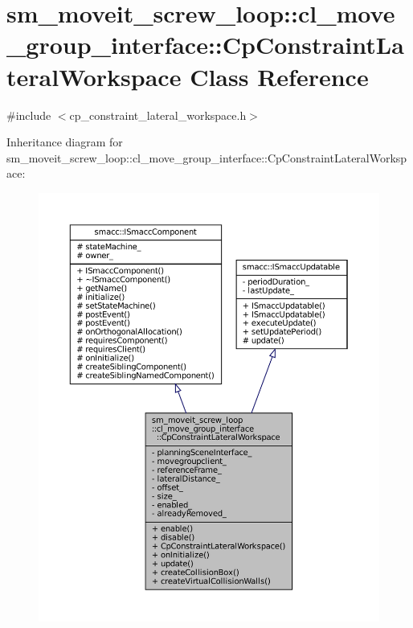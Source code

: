 \hypertarget{classsm__moveit__screw__loop_1_1cl__move__group__interface_1_1CpConstraintLateralWorkspace}{}\section{sm\+\_\+moveit\+\_\+screw\+\_\+loop\+:\+:cl\+\_\+move\+\_\+group\+\_\+interface\+:\+:Cp\+Constraint\+Lateral\+Workspace Class Reference}
\label{classsm__moveit__screw__loop_1_1cl__move__group__interface_1_1CpConstraintLateralWorkspace}


{\ttfamily \#include $<$cp\+\_\+constraint\+\_\+lateral\+\_\+workspace.\+h$>$}



Inheritance diagram for sm\+\_\+moveit\+\_\+screw\+\_\+loop\+:\+:cl\+\_\+move\+\_\+group\+\_\+interface\+:\+:Cp\+Constraint\+Lateral\+Workspace\+:
\nopagebreak
\begin{figure}[H]
\begin{center}
\leavevmode
\includegraphics[width=350pt]{classsm__moveit__screw__loop_1_1cl__move__group__interface_1_1CpConstraintLateralWorkspace__inherit__graph}
\end{center}
\end{figure}


